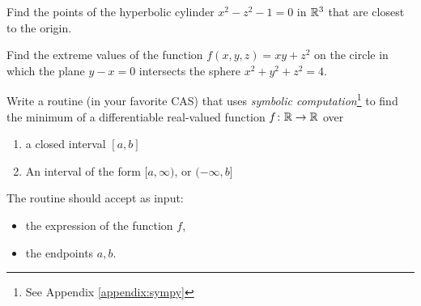 \begin{problem}[Basic] %
Find the points of the hyperbolic cylinder $x^2-z^2-1=0$ in $\mathbb{R}^3$ that are closest to the origin.
\end{problem}

\begin{problem}[Intermediate]
Find the extreme values of the function $f(x,y,z)=xy+z^2$ on the circle in which the plane $y-x=0$ intersects the sphere $x^2+y^2+z^2=4$.
\end{problem}

\begin{problem}[CAS]
Write a routine (in your favorite CAS) that uses \emph{symbolic computation}\footnote{See Appendix \ref{appendix:sympy}} to find the minimum of a differentiable real-valued function $f \colon \mathbb{R} \to \mathbb{R}$ over 
\begin{enumerate}
	\item a closed interval $[a,b]$
	\item An interval of the form $[a,\infty)$, or $(-\infty, b]$
\end{enumerate}
The routine should accept as input:
\begin{itemize}
	\item the expression of the function $f$,
	\item the endpoints $a,b$.
\end{itemize}
\end{problem}